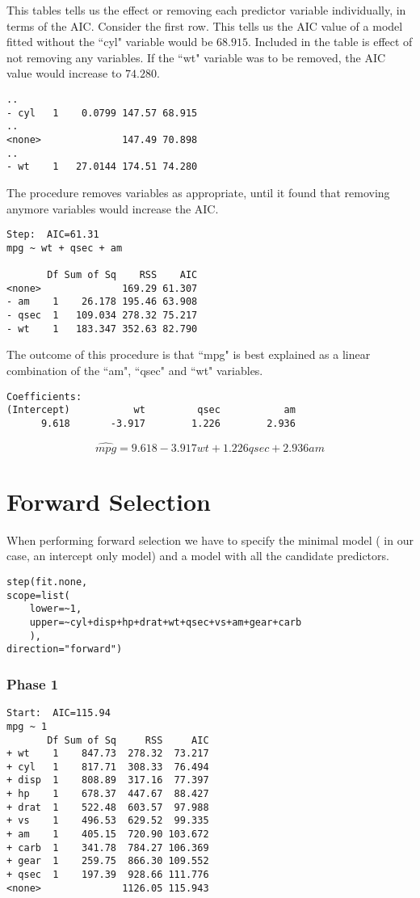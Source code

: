 \documentclass[a4paper,12pt]{article}
\begin{document}
This tables tells us the effect or removing each predictor variable individually, in terms of the AIC.
Consider the first row. This tells us the AIC value of a model fitted without the ``cyl" variable would be $68.915$.
Included in the table is effect of not removing any variables. If the ``wt" variable was to be removed, the AIC value would increase to $74.280$.
\footnotesize
\begin{verbatim}
..
- cyl   1    0.0799 147.57 68.915
..
<none>              147.49 70.898
..
- wt    1   27.0144 174.51 74.280
\end{verbatim}
\normalsize

The procedure removes variables as appropriate, until it found that removing anymore variables would increase the AIC.
\footnotesize \begin{verbatim}
Step:  AIC=61.31
mpg ~ wt + qsec + am

       Df Sum of Sq    RSS    AIC
<none>              169.29 61.307
- am    1    26.178 195.46 63.908
- qsec  1   109.034 278.32 75.217
- wt    1   183.347 352.63 82.790
\end{verbatim}\normalsize

The outcome of this procedure is that ``mpg" is best explained as a linear combination of the ``am", ``qsec" and ``wt" variables.

\begin{verbatim}
Coefficients:
(Intercept)           wt         qsec           am
      9.618       -3.917        1.226        2.936
\end{verbatim}\normalsize

\[
\hat{mpg} = 9.618 - 3.917wt + 1.226qsec + 2.936am
\]

\newpage
\section{Forward Selection}

When performing forward selection we have to specify the minimal model ( in our case, an intercept only model)
and a model with all the candidate predictors.
\footnotesize
\begin{verbatim}
step(fit.none,
scope=list(
	lower=~1,
	upper=~cyl+disp+hp+drat+wt+qsec+vs+am+gear+carb
	),
direction="forward")
\end{verbatim}
\normalsize
\subsubsection{Phase 1}
\footnotesize
\begin{verbatim}
Start:  AIC=115.94
mpg ~ 1
       Df Sum of Sq     RSS     AIC
+ wt    1    847.73  278.32  73.217
+ cyl   1    817.71  308.33  76.494
+ disp  1    808.89  317.16  77.397
+ hp    1    678.37  447.67  88.427
+ drat  1    522.48  603.57  97.988
+ vs    1    496.53  629.52  99.335
+ am    1    405.15  720.90 103.672
+ carb  1    341.78  784.27 106.369
+ gear  1    259.75  866.30 109.552
+ qsec  1    197.39  928.66 111.776
<none>              1126.05 115.943
\end{verbatim}
\normalsize
\end{document}
